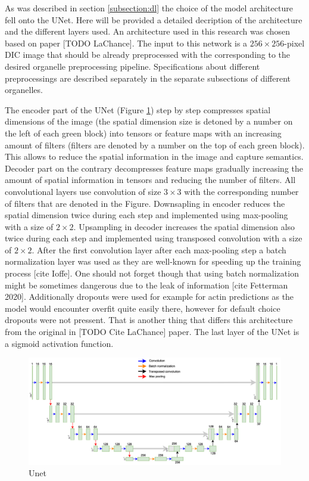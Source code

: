 As was described in section \ref{subsection:dl} the choice of the model architecture fell onto the UNet. Here will be provided a detailed decription of the architecture and the different layers used. An architecture used in this research was chosen based on paper [TODO LaChance]. The input to this network is a $256 \times 256$-pixel DIC image that should be already preprocessed with the corresponding to the desired organelle preprocessing pipeline. Specifications about different preprocessings are described separately in the separate subsections of different organelles.

The encoder part of the UNet (Figure \ref{fig:unet}) step by step compresses spatial dimensions of the image (the spatial dimension size is detoned by a number on the left of each green block) into tensors or feature maps with an increasing amount of filters (filters are denoted by a number on the top of each green block). This allows to reduce the spatial information in the image and capture semantics. Decoder part on the contrary decompresses feature maps gradually increasing the amount of spatial information in tensors and reducing the number of filters. All convolutional layers use convolution of size $3 \times 3$ with the corresponding number of filters that are denoted in the Figure. Downsapling in encoder reduces the spatial dimension twice during each step and implemented using max-pooling with a size of $2 \times 2$. Upsampling in decoder increases the spatial dimension also twice during each step and implemented using transposed convolution with a size of $2 \times 2$. After the first convolution layer after each max-pooling step a batch normalization layer was used as they are well-known for speeding up the training process [cite Ioffe]. One should not forget though that using batch normalization might be sometimes dangerous due to the leak of information [cite Fetterman 2020]. Additionally dropouts were used for example for actin predictions as the model would encounter overfit quite easily there, however for default choice dropouts were not pressent. That is another thing that differs this architecture from the original in [TODO Cite LaChance] paper. The last layer of the UNet is a sigmoid activation function.
\begin{figure}[htb]
	\begin{center}
		\includegraphics[width=\linewidth]{bilder/Unet.png}
		\caption{Unet}\label{fig:unet}
	\end{center}
\end{figure}

